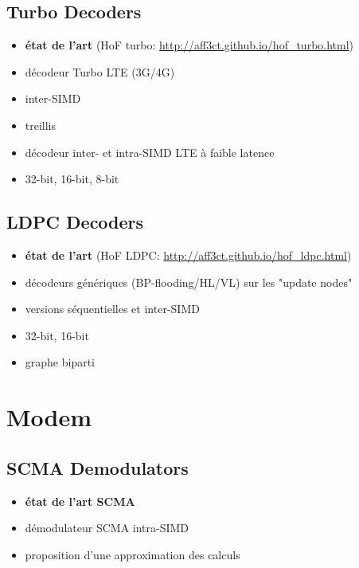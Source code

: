 \subsection{Turbo Decoders~\cite{Cassagne2016a}}

\begin{itemize}
  \item \textbf{état de l'art} (HoF turbo: \url{http://aff3ct.github.io/hof_turbo.html})
  \item décodeur Turbo LTE (3G/4G)
  \item inter-SIMD
  \item treillis
  \item décodeur inter- et intra-SIMD LTE à faible latence
  \item 32-bit, 16-bit, 8-bit
\end{itemize}

\subsection{LDPC Decoders}

\begin{itemize}
  \item \textbf{état de l'art} (HoF LDPC: \url{http://aff3ct.github.io/hof_ldpc.html})
  \item décodeurs génériques (BP-flooding/HL/VL) sur les "update nodes"
  \item versions séquentielles et inter-SIMD
  \item 32-bit, 16-bit
  \item graphe biparti
\end{itemize}

\section{Modem}

\subsection{SCMA Demodulators~\cite{Ghaffari2019}}

\begin{itemize}
  \item \textbf{état de l'art SCMA}
  \item démodulateur SCMA intra-SIMD
  \item proposition d'une approximation des calculs
\end{itemize}
